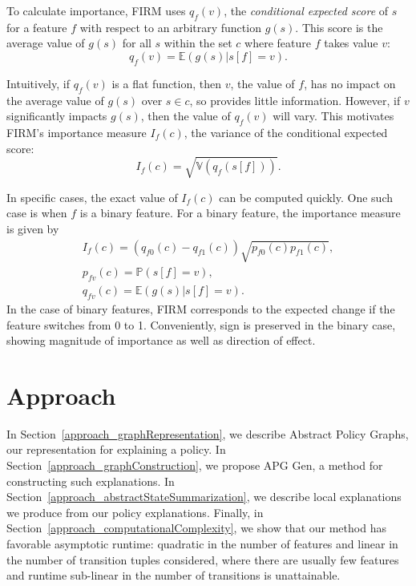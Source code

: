 \documentclass[letterpaper]{article} %
\begin{document}
To calculate importance, FIRM uses $q_f(v)$, the \textit{conditional expected score} of $s$ for a feature $f$ with respect to an arbitrary function $g(s)$. 
This score is the  average value of $g(s)$ for all $s$ within the set $c$ where feature $f$ takes value $v$: 
\begin{equation}
q_f(v) = \mathbb{E}(g(s) | s[f] = v).
\end{equation}

Intuitively, if $q_f(v)$ is a flat function, then $v$, the value of $f$, has no impact on the average value of $g(s)$ over $s \in c$, so provides little information. 
However, if $v$ significantly impacts $g(s)$, then the value of $q_f(v)$ will vary. 
This motivates FIRM's importance measure $I_f(c)$, the variance of the conditional expected score:
\begin{equation}
I_f(c) = \sqrt{\mathbb{V}(q_f(s[f]))}.
\end{equation}

In specific cases, the exact value of $I_f(c)$ can be computed quickly. One such case is when $f$ is a binary feature. 
For a binary feature, the importance measure is given by 
\begin{equation}
\begin{split}
I_f(c) = (q_{f0}(c) - q_{f1}(c)) \sqrt{ p_{f0}(c) p_{f1}(c)},\\
p_{fv}(c) = \mathbb{P}(s[f] = v),\\
q_{fv}(c) = \mathbb{E}(g(s) | s[f] = v).
\end{split}
\end{equation}
In the case of binary features, FIRM corresponds to the expected change if the feature switches from 0 to 1. 
Conveniently, sign is preserved in the binary case, showing magnitude of importance as well as direction of effect.

\section{Approach}
In Section~\ref{approach_graphRepresentation}, we describe Abstract Policy Graphs, our representation for explaining a policy. 
In Section~\ref{approach_graphConstruction}, we propose APG Gen, a method for constructing such explanations. 
In Section~\ref{approach_abstractStateSummarization}, we describe local explanations we produce from our policy explanations. Finally, in Section~\ref{approach_computationalComplexity}, we show that our method has favorable asymptotic runtime: quadratic in the number of features and linear in the number of transition tuples considered, where there are usually few features and runtime sub-linear in the number of transitions is unattainable. 
\end{document}
